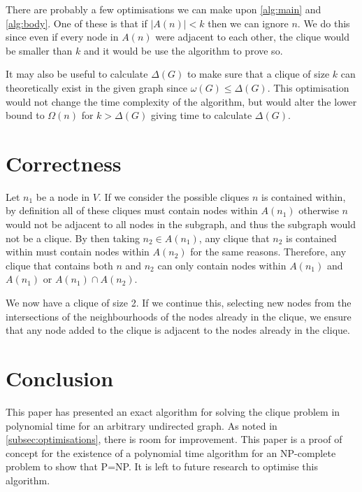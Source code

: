 \documentclass[11pt]{article}
\begin{document}
There are probably a few optimisations we can make upon \cref{alg:main} and \cref{alg:body}. One of these is that if $|A(n)|<k$ then we can ignore $n$. We do this since even if every node in $A(n)$ were adjacent to each other, the clique would be smaller than $k$ and it would be use the algorithm to prove so.

It may also be useful to calculate $\Delta(G)$ to make sure that a clique of size $k$ can theoretically exist in the given graph since $\omega(G)\leq\Delta(G)$. This optimisation would not change the time complexity of the algorithm, but would alter the lower bound to $\Omega(n)$ for $k>\Delta(G)$ giving time to calculate $\Delta(G)$.

\section{Correctness}

Let $n_1$ be a node in $V$. If we consider the possible cliques $n$ is contained within, by definition all of these cliques must contain nodes within $A(n_1)$ otherwise $n$ would not be adjacent to all nodes in the subgraph, and thus the subgraph would not be a clique. By then taking $n_2\in A(n_1)$, any clique that $n_2$ is contained within must contain nodes within $A(n_2)$ for the same reasons. Therefore, any clique that contains both $n$ and $n_2$ can only contain nodes within $A(n_1)$ and $A(n_1)$ or $A(n_1)\cap A(n_2)$.

We now have a clique of size 2. If we continue this, selecting new nodes from the intersections of the neighbourhoods of the nodes already in the clique, we ensure that any node added to the clique is adjacent to the nodes already in the clique.

\section{Conclusion}

This paper has presented an exact algorithm for solving the clique problem in polynomial time for an arbitrary undirected graph. As noted in \cref{subsec:optimisations}, there is room for improvement. This paper is a proof of concept for the existence of a polynomial time algorithm for an NP-complete problem to show that P=NP. It is left to future research to optimise this algorithm.
\end{document}

